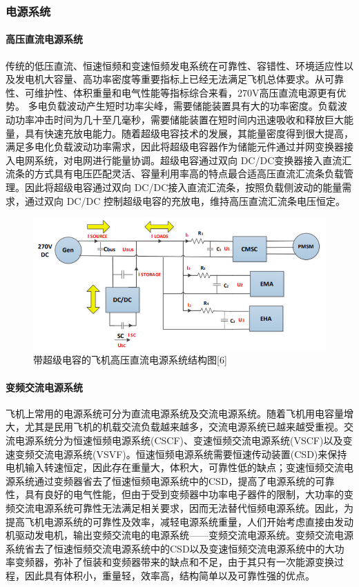 \documentclass[12pt,a4paper]{report}
\begin{document}
\subsubsection{电源系统}
\paragraph{高压直流电源系统}
传统的低压直流、恒速恒频和变速恒频发电系统在可靠性、容错性、环境适应性以及发电机大容量、高功率密度等重要指标上已经无法满足飞机总体要求。从可靠性、可维护性、体积重量和电气性能等指标综合来看，270V高压直流电源更有优势。
多电负载波动产生短时功率尖峰，需要储能装置具有大的功率密度。负载波动功率冲击时间为几十至几毫秒，需要储能装置在短时间内迅速吸收和释放巨大能量，具有快速充放电能力。随着超级电容技术的发展，其能量密度得到很大提高，满足多电化负载波动功率需求，因此将超级电容器作为储能元件通过并网变换器接入电网系统，对电网进行能量协调。超级电容通过双向 DC/DC变换器接入直流汇流条的方式具有电压匹配灵活、容量利用率高的特点最合适高压直流汇流条负载管理。因此将超级电容通过双向 DC/DC接入直流汇流条，按照负载侧波动的能量需求，通过双向 DC/DC 控制超级电容的充放电，维持高压直流汇流条电压恒定。
 
\begin{figure}[htp]
\centering
   \includegraphics[width=.8\textwidth]{battery.jpg}
    \caption{带超级电容的飞机高压直流电源系统结构图[6]}
    \label{fig:battery}
\end{figure}

\paragraph{变频交流电源系统}
飞机上常用的电源系统可分为直流电源系统及交流电源系统。随着飞机用电容量增大，尤其是民用飞机的机载交流负载越来越多，交流电源系统已越来越受重视。交流电源系统分为恒速恒频电源系统(CSCF)、变速恒频交流电源系统(VSCF)以及变速变频交流电源系统(VSVF)。恒速恒频电源系统需要恒速传动装置(CSD)来保持电机输入转速恒定，因此存在重量大，体积大，可靠性低的缺点；变速恒频交流电源系统通过变频器省去了恒速恒频电源系统中的CSD，提高了电源系统的可靠性，具有良好的电气性能，但由于受到变频器中功率电子器件的限制，大功率的变频交流电源系统可靠性无法满足相关要求，因而无法替代恒频电源系统。因此，为提高飞机电源系统的可靠性及效率，减轻电源系统重量，人们开始考虑直接由发动机驱动发电机，输出变频交流电的电源系统——变频交流电源系统。变频交流电源系统省去了恒速恒频交流电源系统中的CSD以及变速恒频交流电源系统中的大功率变频器，弥补了恒装和变频器带来的缺点和不足，由于其只有一次能源变换过程，因此具有体积小，重量轻，效率高，结构简单以及可靠性强的优点。
 
\end{document}
